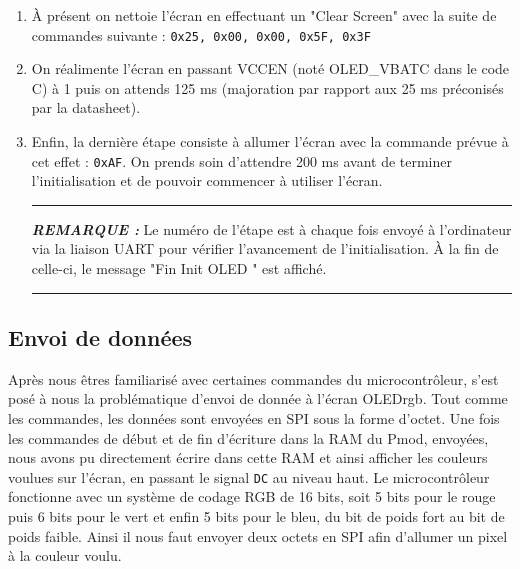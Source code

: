 \documentclass[11pt]{article}
\newcommand{\HRule}{\rule{\linewidth}{0.5mm}}
\newenvironment{rmq}[1] {\noindent\HRule\par\vspace{5pt}\textbf{\textit{REMARQUE : }}#1}{\\\HRule\par\vspace{5pt}}
\begin{document}
\begin{enumerate}
    \item À présent on nettoie l'écran en effectuant un "Clear Screen" avec la suite de commandes suivante : \texttt{0x25, 0x00, 0x00, 0x5F, 0x3F}

    \item On réalimente l'écran en passant VCCEN (noté OLED\_VBATC dans le code C) à 1 puis on attends 125 ms (majoration par rapport aux 25 ms préconisés par la datasheet). 

    \item Enfin, la dernière étape consiste à allumer l'écran avec la commande prévue à cet effet : \texttt{0xAF}. On prends soin d'attendre 200 ms avant de terminer l'initialisation et de pouvoir commencer à utiliser l'écran. 

    \begin{rmq}
    Le numéro de l'étape est à chaque fois envoyé à l'ordinateur via la liaison UART pour vérifier l'avancement de l'initialisation. À la fin de celle-ci, le message "Fin Init OLED " est affiché. 
    \end{rmq}


\end{enumerate}


\subsection{Envoi de données}

Après nous êtres familiarisé avec certaines commandes du microcontrôleur, s'est posé à nous la problématique d'envoi de donnée à l'écran OLEDrgb. Tout comme les commandes, les données sont envoyées en SPI sous la forme d'octet. Une fois les commandes de début et de fin d'écriture dans la RAM du Pmod, envoyées, nous avons pu directement écrire dans cette RAM et ainsi afficher les couleurs voulues sur l'écran, en passant le signal \texttt{DC} au niveau haut. Le microcontrôleur fonctionne avec un système de codage RGB de 16 bits, soit 5 bits pour le rouge puis 6 bits pour le vert et enfin 5 bits pour le bleu, du bit de poids fort au bit de poids faible. Ainsi il nous faut envoyer deux octets en SPI afin d'allumer un pixel à la couleur voulu. 
\end{document}

